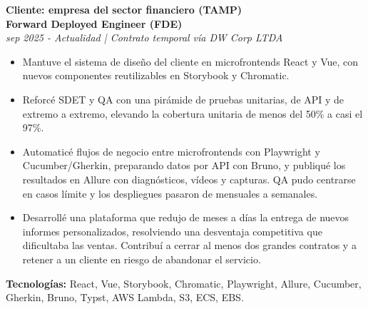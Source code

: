 \documentclass[10pt,a4paper]{altacv}
\begin{document}
\textbf{Cliente: empresa del sector financiero (TAMP)}\\
\textbf{Forward Deployed Engineer (FDE)}\\
\textit{sep 2025 - Actualidad | Contrato temporal vía DW Corp LTDA}
\begin{itemize}
\setlength{\itemindent}{0.5em}
\item[--] Mantuve el sistema de diseño del cliente en microfrontends React y Vue, con nuevos componentes reutilizables en Storybook y Chromatic.
\item[--] Reforcé SDET y QA con una pirámide de pruebas unitarias, de API y de extremo a extremo, elevando la cobertura unitaria de menos del 50\% a casi el 97\%.
\item[--] Automaticé flujos de negocio entre microfrontends con Playwright y Cucumber/Gherkin, preparando datos por API con Bruno, y publiqué los resultados en Allure con diagnósticos, vídeos y capturas. QA pudo centrarse en casos límite y los despliegues pasaron de mensuales a semanales.
\item[--] Desarrollé una plataforma que redujo de meses a días la entrega de nuevos informes personalizados, resolviendo una desventaja competitiva que dificultaba las ventas. Contribuí a cerrar al menos dos grandes contratos y a retener a un cliente en riesgo de abandonar el servicio.
\end{itemize}
\textbf{Tecnologías:} React, Vue, Storybook, Chromatic, Playwright, Allure, Cucumber, Gherkin, Bruno, Typst, AWS Lambda, S3, ECS, EBS.

\newpage
{}
\end{document}
